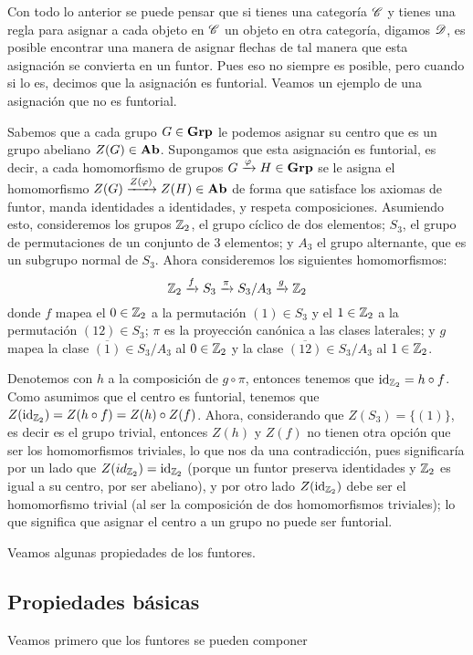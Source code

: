 \documentclass{comunicaciones}
\begin{document}
Con todo lo anterior se puede pensar que si tienes una categoría $\mathscr C$ y tienes una regla para asignar a cada objeto en $\mathscr C$ un objeto en otra categoría, digamos $\mathscr D$,
es posible encontrar una manera de asignar flechas de tal manera que esta asignación se convierta en un funtor. Pues eso no siempre es posible, pero cuando si lo es,
decimos que la asignación es funtorial. Veamos un ejemplo de una asignación que no es funtorial.

\begin{ej}
    Sabemos que a cada grupo $G\in\mathbf{Grp}$ le podemos asignar su centro que es un grupo abeliano $Z(G)\in\mathbf{Ab}$. Supongamos que esta asignación es funtorial, es decir,
    a cada homomorfismo de grupos $G\xrightarrow{\varphi}H\in\mathbf{Grp}$ se le asigna el homomorfismo $Z(G)\xrightarrow{Z(\varphi)}Z(H)\in\mathbf{Ab}$ de forma que satisface los axiomas
    de funtor, manda identidades a identidades, y respeta composiciones. Asumiendo esto, consideremos los grupos $\mathbb Z_2$, el grupo cíclico de dos elementos; $S_3$,
    el grupo de permutaciones de un conjunto de 3 elementos; y $A_3$ el grupo alternante, que es un subgrupo normal de $S_3$. Ahora consideremos los siguientes homomorfismos:
    \[\mathbb Z_2\xrightarrow{f}S_3\xrightarrow{\pi}S_3/A_3\xrightarrow{g}\mathbb Z_2\]
    donde $f$ mapea el $0\in\mathbb Z_2$ a la permutación $(1)\in S_3$ y el $1\in\mathbb Z_2$ a la permutación $(12)\in S_3$; $\pi$ es la proyección canónica a las 
    clases laterales; y $g$ mapea la clase $\overline{(1)}\in S_3/A_3$ al $0\in\mathbb Z_2$ y la clase $\overline{(12)}\in S_3/A_3$ al $1\in\mathbb Z_2$.
    
    Denotemos con $h$ a la composición de $g\circ\pi$, entonces tenemos que $\mathrm{id}_{\mathbb Z_2}=h\circ f$. Como asumimos que el centro es funtorial, tenemos que
    $Z(\mathrm{id}_{\mathbb Z_2})=Z(h\circ f)=Z(h)\circ Z(f)$. Ahora, considerando que $Z(S_3)=\{(1)\}$, es decir
    es el grupo trivial, entonces $Z(h)$ y $Z(f)$ no tienen otra opción que ser los homomorfismos triviales, lo que nos da una contradicción, pues significaría
    por un lado que $Z(id_{\mathbb Z_2})=\mathrm{id}_{\mathbb Z_2}$ (porque un funtor preserva identidades y $\mathbb Z_2$ es igual a su centro, por ser abeliano), y por otro lado $Z(\mathrm{id}_{\mathbb Z_2})$
    debe ser el homomorfismo trivial (al ser la composición de dos homomorfismos triviales); lo que significa que asignar el centro a un grupo no puede ser funtorial.
\end{ej}

Veamos algunas propiedades de los funtores.

\subsection{Propiedades básicas}
Veamos primero que los funtores se pueden componer
\end{document}
